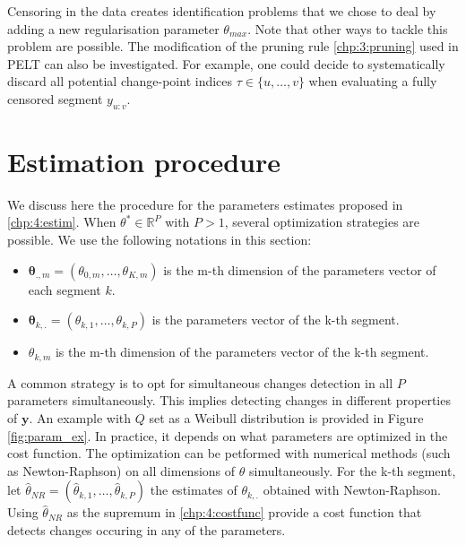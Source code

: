 Censoring in the data creates identification problems that we chose to deal by adding a new regularisation parameter $\theta_{max}$. Note that other ways to tackle this problem are possible. The modification of the pruning rule \ref{chp:3:pruning} used in PELT can also be investigated. For example, one could decide to systematically discard all potential change-point indices $\tau \in \{u,\dots,v\}$ when evaluating a fully censored segment $y_{u:v}$.  

\section{Estimation procedure}\label{chp:4:3}

We discuss here the procedure for the parameters estimates proposed in \ref{chp:4:estim}. When $\theta^* \in \mathbb{R}^P$ with $P > 1$, several optimization strategies are possible. We use the following notations in this section: 
\begin{itemize}
\item $\bm \theta_{.,m} = (\theta_{0,m},\dots,\theta_{K,m})$ is the m-th dimension of the parameters vector of each segment $k$.
\item $\bm \theta_{k,.} = (\theta_{k,1},\dots,\theta_{k,P})$ is the parameters vector of the k-th segment.
\item $\theta_{k,m}$ is the m-th dimension of the parameters vector of the k-th segment.
\end{itemize}
 
A common strategy is to opt for simultaneous changes detection in all $P$ parameters simultaneously. This implies detecting changes in different properties of $\bm y$. An example with $Q$ set as a Weibull distribution is provided in Figure \ref{fig:param_ex}. In practice, it depends on what parameters are optimized in the cost function. The optimization can be petformed with numerical methods (such as Newton-Raphson) on all dimensions of $\theta$ simultaneously. For the k-th segment, let $\widehat{\theta}_{NR} = (\widehat{\theta}_{k,1},\dots,\widehat{\theta}_{k,P})$ the estimates of $\theta_{k,.}$ obtained with Newton-Raphson. Using $\widehat{\theta}_{NR}$ as the supremum in \ref{chp:4:costfunc} provide a cost function that detects changes occuring in any of the parameters.  

